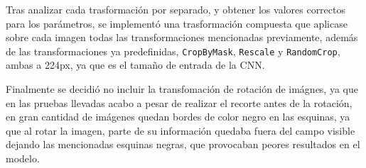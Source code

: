 Tras analizar cada trasformación por separado, y obtener los valores correctos para los parámetros, se implementó una trasformación compuesta que aplicase sobre cada imagen todas las transformaciones mencionadas previamente, además de las transformaciones ya predefinidas, \texttt{CropByMask}, \texttt{Rescale} y \texttt{RandomCrop}, ambas a 224px, ya que es el tamaño de entrada de la CNN.\medskip

Finalmente se decidió no incluir la transfomación de rotación de imágnes, ya que en las pruebas llevadas acabo a pesar de realizar el recorte antes de la rotación, en gran cantidad de imágenes quedan bordes de color negro en las esquinas, ya que al rotar la imagen, parte de su información quedaba fuera del campo visible dejando las mencionadas esquinas negras, que provocaban peores resultados en el modelo.